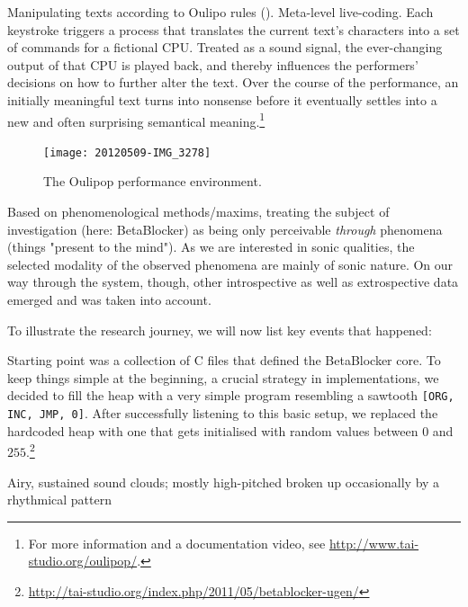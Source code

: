 \documentclass[letterpaper, 12pt]{article}
\begin{document}
Manipulating texts according to Oulipo rules (\cite{mathews2005-oul}).
Meta-level live-coding. 
Each keystroke triggers a process that translates the current text's characters into a set of commands for a fictional CPU. 
Treated as a sound signal, the ever-changing output of that CPU is played back, and thereby influences the performers' decisions on how to further alter the text. 
Over the course of the performance, an initially meaningful text turns into nonsense before it eventually settles into a new and often surprising semantical meaning.\footnote{For more information and a documentation video, see \url{http://www.tai-studio.org/oulipop/}.}
\begin{figure}
	\centering
		\texttt{[image: 20120509-IMG\_3278]}
	\caption{The Oulipop performance environment.}
	\label{fig:fig_20120509-IMG_3278}
\end{figure}


Based on phenomenological methods/maxims, treating the subject of investigation (here: BetaBlocker) as being only perceivable \emph{through} phenomena (things "present to the mind"). 
As we are interested in sonic qualities, the selected modality of the observed phenomena are mainly of sonic nature.
On our way through the system, though, other introspective as well as extrospective data emerged and was taken into account.

To illustrate the research journey, we will now list key events that happened:

Starting point was a collection of C files that defined the BetaBlocker core.
To keep things simple at the beginning, a crucial strategy in implementations, we decided to fill the heap with a very simple program resembling a sawtooth \verb#[ORG, INC, JMP, 0]#. 
After successfully listening to this basic setup, we replaced the hardcoded heap with one that gets initialised with random values between $0$ and $255$.\footnote{\url{http://tai-studio.org/index.php/2011/05/betablocker-ugen/}}

Airy, sustained sound clouds; mostly high-pitched broken up occasionally by a rhythmical pattern
\end{document}
